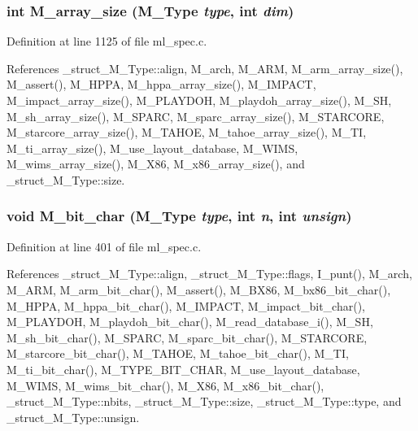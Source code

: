 \subsubsection{\setlength{\rightskip}{0pt plus 5cm}int M\_\-array\_\-size (\bf{M\_\-Type} {\em type}, int {\em dim})}\label{ml__spec_8c_eba35106a4ffb0e4d2120838e4e5a41f}




Definition at line 1125 of file ml\_\-spec.c.

References \_\-struct\_\-M\_\-Type::align, M\_\-arch, M\_\-ARM, M\_\-arm\_\-array\_\-size(), M\_\-assert(), M\_\-HPPA, M\_\-hppa\_\-array\_\-size(), M\_\-IMPACT, M\_\-impact\_\-array\_\-size(), M\_\-PLAYDOH, M\_\-playdoh\_\-array\_\-size(), M\_\-SH, M\_\-sh\_\-array\_\-size(), M\_\-SPARC, M\_\-sparc\_\-array\_\-size(), M\_\-STARCORE, M\_\-starcore\_\-array\_\-size(), M\_\-TAHOE, M\_\-tahoe\_\-array\_\-size(), M\_\-TI, M\_\-ti\_\-array\_\-size(), M\_\-use\_\-layout\_\-database, M\_\-WIMS, M\_\-wims\_\-array\_\-size(), M\_\-X86, M\_\-x86\_\-array\_\-size(), and \_\-struct\_\-M\_\-Type::size.
\subsubsection{\setlength{\rightskip}{0pt plus 5cm}void M\_\-bit\_\-char (\bf{M\_\-Type} {\em type}, int {\em n}, int {\em unsign})}\label{ml__spec_8c_4986ab3571eb8d113aeb2afcd5786aa1}




Definition at line 401 of file ml\_\-spec.c.

References \_\-struct\_\-M\_\-Type::align, \_\-struct\_\-M\_\-Type::flags, I\_\-punt(), M\_\-arch, M\_\-ARM, M\_\-arm\_\-bit\_\-char(), M\_\-assert(), M\_\-BX86, M\_\-bx86\_\-bit\_\-char(), M\_\-HPPA, M\_\-hppa\_\-bit\_\-char(), M\_\-IMPACT, M\_\-impact\_\-bit\_\-char(), M\_\-PLAYDOH, M\_\-playdoh\_\-bit\_\-char(), M\_\-read\_\-database\_\-i(), M\_\-SH, M\_\-sh\_\-bit\_\-char(), M\_\-SPARC, M\_\-sparc\_\-bit\_\-char(), M\_\-STARCORE, M\_\-starcore\_\-bit\_\-char(), M\_\-TAHOE, M\_\-tahoe\_\-bit\_\-char(), M\_\-TI, M\_\-ti\_\-bit\_\-char(), M\_\-TYPE\_\-BIT\_\-CHAR, M\_\-use\_\-layout\_\-database, M\_\-WIMS, M\_\-wims\_\-bit\_\-char(), M\_\-X86, M\_\-x86\_\-bit\_\-char(), \_\-struct\_\-M\_\-Type::nbits, \_\-struct\_\-M\_\-Type::size, \_\-struct\_\-M\_\-Type::type, and \_\-struct\_\-M\_\-Type::unsign.
